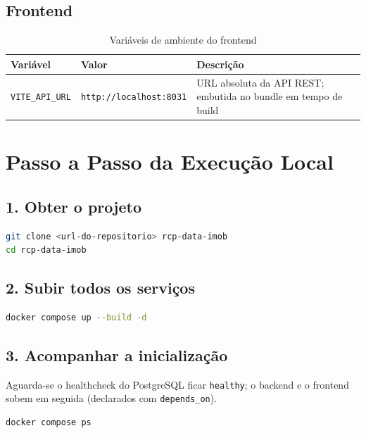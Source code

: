 \documentclass[12pt, a4paper]{article}
\newcommand{\thead}[1]{\cellcolor{tableheader}\color{white}\bfseries #1}
\begin{document}
\subsection{Frontend}

\begin{table}[H]
\centering
\begin{tabularx}{\textwidth}{|l|l|X|}
\hline
\thead{Variável} & \thead{Valor} & \thead{Descrição} \\
\hline
\texttt{VITE\_API\_URL} & \texttt{http://localhost:8031} & URL absoluta da API REST; embutida no bundle em tempo de build \\
\hline
\end{tabularx}
\caption{Variáveis de ambiente do frontend}
\end{table}

\section{Passo a Passo da Execução Local}

\subsection{1. Obter o projeto}

\begin{lstlisting}[language=Bash]
git clone <url-do-repositorio> rcp-data-imob
cd rcp-data-imob
\end{lstlisting}

\subsection{2. Subir todos os serviços}

\begin{lstlisting}[language=Bash]
docker compose up --build -d
\end{lstlisting}

\subsection{3. Acompanhar a inicialização}

Aguarda-se o healthcheck do PostgreSQL ficar \texttt{healthy}; o backend e o frontend sobem em
seguida (declarados com \texttt{depends\_on}).

\begin{lstlisting}[language=Bash]
docker compose ps
\end{lstlisting}
\end{document}

